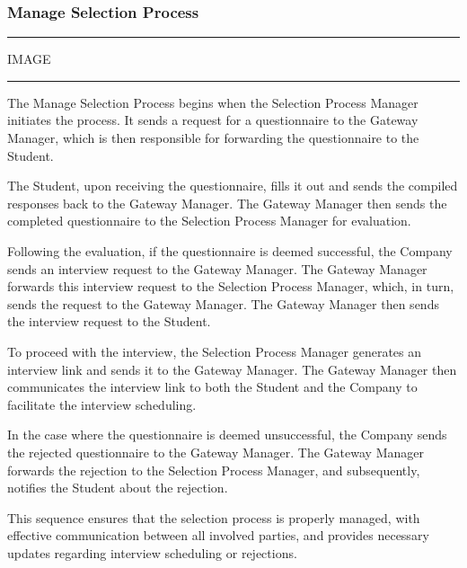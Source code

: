 \subsubsection{Manage Selection Process}

\vspace{20pt}
\hrule
\vspace{10pt}
IMAGE
\vspace{10pt}
\hrule
\vspace{20pt}

The Manage Selection Process begins when the Selection Process Manager initiates the process. It sends a request for a questionnaire to the Gateway Manager, which is then responsible for forwarding the questionnaire to the Student.

The Student, upon receiving the questionnaire, fills it out and sends the compiled responses back to the Gateway Manager. The Gateway Manager then sends the completed questionnaire to the Selection Process Manager for evaluation.

Following the evaluation, if the questionnaire is deemed successful, the Company sends an interview request to the Gateway Manager. The Gateway Manager forwards this interview request to the Selection Process Manager, which, in turn, sends the request to the Gateway Manager. The Gateway Manager then sends the interview request to the Student.

To proceed with the interview, the Selection Process Manager generates an interview link and sends it to the Gateway Manager. The Gateway Manager then communicates the interview link to both the Student and the Company to facilitate the interview scheduling.

In the case where the questionnaire is deemed unsuccessful, the Company sends the rejected questionnaire to the Gateway Manager. The Gateway Manager forwards the rejection to the Selection Process Manager, and subsequently, notifies the Student about the rejection.

This sequence ensures that the selection process is properly managed, with effective communication between all involved parties, and provides necessary updates regarding interview scheduling or rejections.

